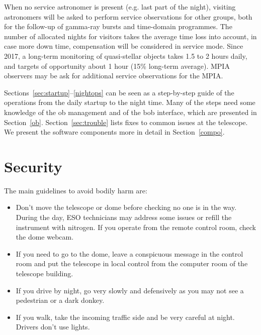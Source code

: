 \documentclass[11pt,fleqn]{book}
\begin{document}
When no service astronomer is present (e.g. last part of the night), visiting astronomers will be asked to perform service observations for other groups, both for the follow-up of gamma-ray bursts and time-domain programmes.  The number of allocated nights for visitors takes the average time loss into account, in case more down time, compensation will be considered in service mode.  Since 2017, a long-term monitoring of quasi-stellar objects takes 1.5 to 2 hours daily, and targets of opportunity about 1 hour (15\% long-term average).  MPIA observers may be ask for additional service observations for the MPIA.

Sections~\ref{sec:startup}--\ref{nightops} can be seen as a step-by-step guide
of the operations from the daily startup to the night time. Many of the steps
need some knowledge of the \gls{ob} management and of the \gls{bob} interface,
which are presented in Section~\ref{ob}.  Section~\ref{sec:trouble} lists fixes
to common issues at the telescope.  We present the software components more in
detail in Section~\ref{compo}.

\section{Security}

The main guidelines to avoid bodily harm are:
\begin{itemize}
\item Don't move the telescope or dome before checking no one is in the way.  During the day, ESO technicians may address some issues or refill the instrument with nitrogen.  If you operate from the remote control room, check the dome webcam.
\item If you need to go to the dome, leave a conspicuous message in the control room and put the telescope in local control from the computer room of the telescope building.
\item If you drive by night, go very slowly and defensively as you may not see a pedestrian or a dark donkey.  
\item If you walk, take the incoming traffic side and be very careful at night. Drivers don't use lights.
\end{itemize}
\end{document}

